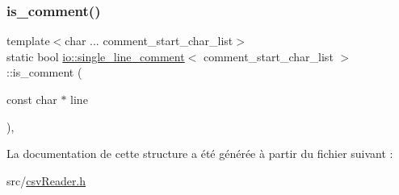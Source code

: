 \subsubsection{\texorpdfstring{is\+\_\+comment()}{is\_comment()}}
{\footnotesize\ttfamily template$<$char ... comment\+\_\+start\+\_\+char\+\_\+list$>$ \\
static bool \hyperlink{structio_1_1single__line__comment}{io\+::single\+\_\+line\+\_\+comment}$<$ comment\+\_\+start\+\_\+char\+\_\+list $>$\+::is\+\_\+comment (\begin{DoxyParamCaption}\item[{const char $\ast$}]{line }\end{DoxyParamCaption})\hspace{0.3cm}{\ttfamily [inline]}, {\ttfamily [static]}}



La documentation de cette structure a été générée à partir du fichier suivant \+:\begin{DoxyCompactItemize}
\item 
src/\hyperlink{csvReader_8h}{csv\+Reader.\+h}\end{DoxyCompactItemize}
